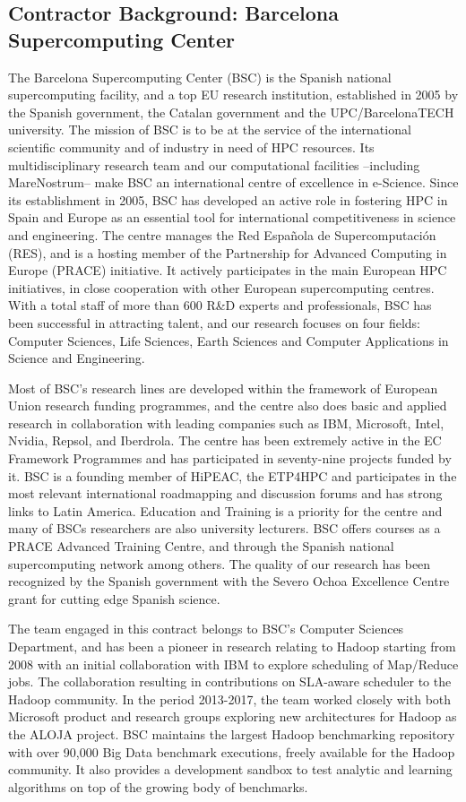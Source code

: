 \subsection{Contractor Background: Barcelona Supercomputing Center}
The Barcelona Supercomputing Center (BSC) is the Spanish national supercomputing facility, and a top EU research institution, established in 2005 by the Spanish government, the Catalan government and the UPC/BarcelonaTECH university. The mission of BSC is to be at the service of the international scientific community and of industry in need of HPC resources. Its multidisciplinary research team and our computational facilities –including MareNostrum– make BSC an international centre of excellence in e-Science. Since its establishment in 2005, BSC has developed an active role in fostering HPC in Spain and Europe as an essential tool for international competitiveness in science and engineering. The centre manages the Red Espa\~nola de Supercomputaci\'on (RES), and is a hosting member of the Partnership for Advanced Computing in Europe (PRACE) initiative. It actively participates in the main European HPC initiatives, in close cooperation with other European supercomputing centres. With a total staff of more than 600 R\&D experts and professionals, BSC has been successful in attracting talent, and our research focuses on four fields: Computer Sciences, Life Sciences, Earth Sciences and Computer Applications in Science and Engineering.

Most of BSC's research lines are developed within the framework of European Union research funding programmes, and the centre also does basic and applied research in collaboration with leading companies such as IBM, Microsoft, Intel, Nvidia, Repsol, and Iberdrola. The centre has been extremely active in the EC Framework Programmes and has participated in seventy-nine projects funded by it. BSC is a founding member of HiPEAC, the ETP4HPC and participates in the most relevant international roadmapping and discussion forums and has strong links to Latin America. Education and Training is a priority for the centre and many of BSCs researchers are also university lecturers. BSC offers courses as a PRACE Advanced Training Centre, and through the Spanish national supercomputing network among others. The quality of our research has been recognized by the Spanish government with the Severo Ochoa Excellence Centre grant for cutting edge Spanish science.

The team engaged in this contract belongs to BSC’s Computer Sciences Department, and has been a pioneer in research relating to Hadoop starting from 2008 with an initial collaboration with IBM to explore scheduling of Map/Reduce jobs. The collaboration resulting in contributions on SLA-aware scheduler to the Hadoop community.  In the period 2013-2017, the team worked closely with both Microsoft product and research groups exploring new architectures for Hadoop as the ALOJA project. BSC maintains the largest Hadoop benchmarking repository with over 90,000 Big Data benchmark executions, freely available for the Hadoop community. It also provides a development sandbox to test analytic and learning algorithms on top of the growing body of benchmarks.

